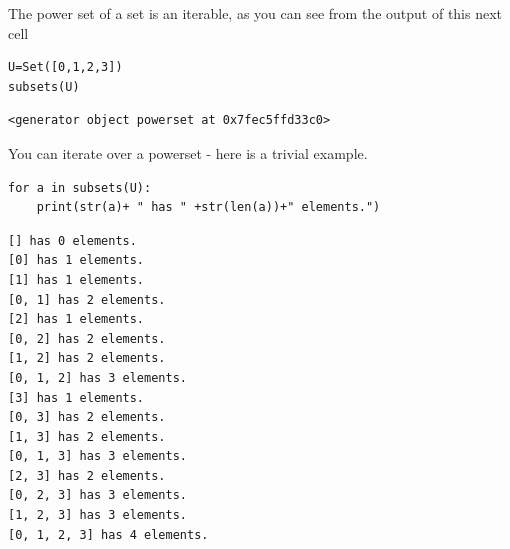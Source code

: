 \documentclass[10pt,]{book}
\theoremstyle{plain}
\theoremstyle{definition}
\theoremstyle{definition}
\theoremstyle{definition}
\theoremstyle{definition}
\begin{document}
The power set of a set is an iterable, as you can see from the output of this next cell
%
\begin{lstlisting}[style=sageinput]
U=Set([0,1,2,3])
subsets(U)
\end{lstlisting}
\begin{lstlisting}[style=sageoutput]
<generator object powerset at 0x7fec5ffd33c0>
\end{lstlisting}
\par

You can iterate over a powerset - here is a trivial example.  
%
\begin{lstlisting}[style=sageinput]
for a in subsets(U):
    print(str(a)+ " has " +str(len(a))+" elements.")
\end{lstlisting}
\begin{lstlisting}[style=sageoutput]
[] has 0 elements.
[0] has 1 elements.
[1] has 1 elements.
[0, 1] has 2 elements.
[2] has 1 elements.
[0, 2] has 2 elements.
[1, 2] has 2 elements.
[0, 1, 2] has 3 elements.
[3] has 1 elements.
[0, 3] has 2 elements.
[1, 3] has 2 elements.
[0, 1, 3] has 3 elements.
[2, 3] has 2 elements.
[0, 2, 3] has 3 elements.
[1, 2, 3] has 3 elements.
[0, 1, 2, 3] has 4 elements.
\end{lstlisting}
\typeout{************************************************}
\typeout{************************************************}
\end{document}

